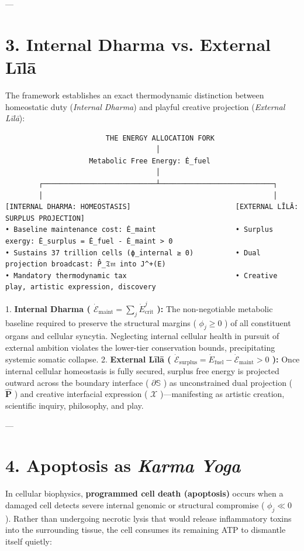 \documentclass[11pt,a4paper]{article}
\theoremstyle{definition}
\theoremstyle{remark}
\begin{document}
---

\section{3. Internal Dharma vs. External Līlā}

The framework establishes an exact thermodynamic distinction between homeostatic duty (\textit{Internal Dharma}) and playful creative projection (\textit{External Līlā}):

\begin{verbatim}
                        THE ENERGY ALLOCATION FORK
                                    │
                    Metabolic Free Energy: Ė_fuel
                                    │
        ┌───────────────────────────┴───────────────────────────┐
        │                                                       │
[INTERNAL DHARMA: HOMEOSTASIS]                         [EXTERNAL LĪLĀ: SURPLUS PROJECTION]
• Baseline maintenance cost: Ė_maint                   • Surplus exergy: Ė_surplus = Ė_fuel - Ė_maint > 0
• Sustains 37 trillion cells (ϕ_internal ≥ 0)          • Dual projection broadcast: P̂_𝔗𝔪 into J^+(E)
• Mandatory thermodynamic tax                          • Creative play, artistic expression, discovery
\end{verbatim}

1. \textbf{Internal Dharma ( $\dot{\mathcal{E}}_{\text{maint}} = \sum_j \dot{E}_{\text{crit}}^j$ ):}
The non-negotiable metabolic baseline required to preserve the structural margins ( $\phi_j \ge 0$ ) of all constituent organs and cellular syncytia. Neglecting internal cellular health in pursuit of external ambition violates the lower-tier conservation bounds, precipitating systemic somatic collapse.
2. \textbf{External Līlā ( $\dot{\mathcal{E}}_{\text{surplus}} = \dot{E}_{\text{fuel}} - \dot{\mathcal{E}}_{\text{maint}} > 0$ ):}
Once internal cellular homeostasis is fully secured, surplus free energy is projected outward across the boundary interface ( $\partial\mathbb{S}$ ) as unconstrained dual projection ( $\hat{\mathbf{P}}$ ) and creative interfacial expression ( $\boldsymbol{\mathcal{X}}$ )—manifesting as artistic creation, scientific inquiry, philosophy, and play.

---

\section{4. Apoptosis as \textit{Karma Yoga}}

In cellular biophysics, \textbf{programmed cell death (apoptosis)} occurs when a damaged cell detects severe internal genomic or structural compromise ( $\phi_j \ll 0$ ). Rather than undergoing necrotic lysis that would release inflammatory toxins into the surrounding tissue, the cell consumes its remaining ATP to dismantle itself quietly:
\end{document}
